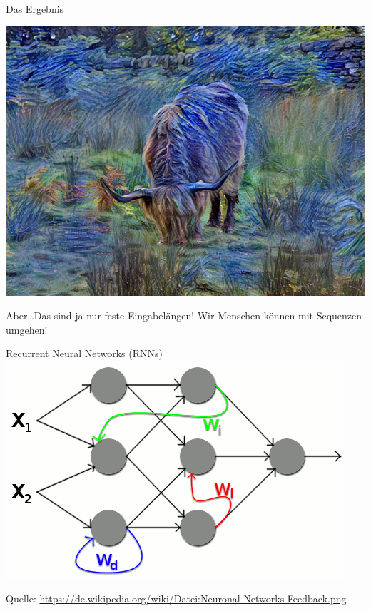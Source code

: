 \begin{frame}{Das Ergebnis}
    \begin{center}
        \includegraphics[width=\textwidth, height=0.8\textheight, keepaspectratio]{../figures/Artistic-Style/Scottish-highland-cattle-1-style.jpg}
    \end{center}
\end{frame}


\begin{frame}{}
    \begin{center}
        \Huge Aber\dots Das sind ja nur feste Eingabelängen! Wir Menschen
              können mit Sequenzen umgehen!
    \end{center}
\end{frame}

\begin{frame}{Recurrent Neural Networks (RNNs)}
    \includegraphics[width=\textwidth, height=0.8\textheight, keepaspectratio]{../presentation-images/recurrrent-neural-networks.png}

    Quelle: \href{https://de.wikipedia.org/wiki/Datei:Neuronal-Networks-Feedback.png}{https://de.wikipedia.org/wiki/Datei:Neuronal-Networks-Feedback.png}
\end{frame}


